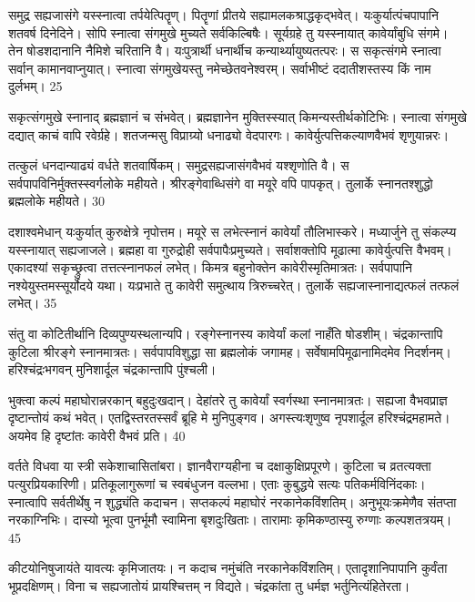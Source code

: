 समुद्र सह्यजासंगे यस्स्नात्वा तर्पयेत्पितॄण्।
पितॄणां प्रीतये सह्यामलकश्राद्धकृद्भवेत्।
यःकुर्यात्पंचपापानि शतवर्ष दिनेदिने।
सोपि स्नात्वा संगमुखे मुच्यते सर्वकिल्बिषैः।
सूर्यग्रहे तु यस्स्नायात् कावेर्यांबुधि संगमे।
तेन षोडशदानानि नैमिशे चरितानि वै।
यःपुत्रार्थी धनार्थीच कन्यार्थ्यायुष्यतत्परः।
स सकृत्संगमे स्नात्वा सर्वान् कामानवाप्नुयात्।
स्नात्वा संगमुखेयस्तु नमेच्छेतवनेश्वरम्।
सर्वाभीष्टं ददातीशस्तस्य किं नाम दुर्लभम्।
25

सकृत्संगमुखे स्नानाद् ब्रह्मज्ञानं च संभवेत्।
ब्रह्मज्ञानेन मुक्तिस्स्यात् किमन्यस्तीर्थकोटिभिः।
स्नात्वा संगमुखे दद्यात् काचं वापि रवेर्ग्रहे।
शतजन्मसु विप्राग्र्यो धनाढ्यो वेदपारगः।
कावेर्युत्पत्तिकल्याणवैभवं शृणुयान्नरः।

तत्कुलं धनदान्याढ्यं वर्धते शतवार्षिकम्।
समुद्रसह्यजासंगवैभवं यश्शृणोति वै।
स सर्वपापविनिर्मुक्तस्स्वर्गलोके महीयते।
श्रीरङ्गेवाब्धिसंगे वा मयूरे वपि पापकृत्।
तुलार्के स्नानतश्शुद्धो ब्रह्मलोके महीयते।
30

दशाश्वमेधान् यःकुर्यात् कुरुक्षेत्रे नृपोत्तम।
मयूरे स लभेत्स्नानं कावेर्यां तौलिभास्करे।
मध्यार्जुने तु संकल्प्य यस्स्नायात् सह्यजाजले।
ब्रह्महा वा गुरुद्रोही सर्वपापैःप्रमुच्यते।
सर्वाशक्तोपि मूढात्मा कावेर्युत्पत्ति वैभवम्।
एकादश्यां सकृच्छ्रुत्वा तत्तत्स्नानफलं लभेत्।
किमत्र बहुनोक्तेन कावेरीस्मृतिमात्रतः।
सर्वपापानि नश्येयुस्तमस्सूर्योदये यथा।
यःप्रभाते तु कावेरी समुत्थाय त्रिरुच्चरेत्।
तुलार्के सह्यजास्नानाद्यत्फलं तत्फलं लभेत्।
35

संतु वा कोटितीर्थानि दिव्यपुण्यस्थलान्यपि।
रङ्गेस्नानस्य कावेर्यां कलां नाहँति षोडशीम्।
चंद्रकान्तापि कुटिला श्रीरङ्गे स्नानमात्रतः।
सर्वपापविशुद्धा सा ब्रह्मलोकं जगामह।
सर्वेषामपिमूढानामिदमेव निदर्शनम्।
हरिश्चंद्रःभगवन् मुनिशार्दूल चंद्रकान्तापि पुंश्चली।

भुक्त्वा कल्पं महाघोरान्नरकान् बहुदुःखदान्।
देहांतरे तु कावेर्यां स्वर्गस्था स्नानमात्रतः।
सह्यजा वैभवप्राज्ञ दृष्टान्तोयं कथं भवेत्।
एतद्विस्तरतस्सर्वं ब्रूहि मे मुनिपुङ्गव।
अगस्त्यःशृणुष्व नृपशार्दूल हरिश्चंद्रमहामते।
अयमेव हि दृष्टांतः कावेरी वैभवं प्रति।
40

वर्तते विधवा या स्त्री सकेशाचासितांबरा।
ज्ञानवैराग्यहीना च दक्षाकुक्षिप्रपूरणे।
कुटिला च व्रतत्यक्ता पत्युरप्रियकारिणी।
प्रतिकूलागुरूणां च स्वबंधुजन वल्लभा।
एताः कुबुद्धये सत्यः पतिकर्मविनिंदकाः।
स्नात्वापि सर्वतीर्थेषु न शुद्ध्यंति कदाचन।
सप्तकल्पं महाघोरं नरकानेकविंशतिम्।
अनुभूयःक्रमेणैव संतप्ता नरकाग्निभिः।
दास्यो भूत्वा पुनर्भूमौ स्वामिना बृशदुःखिताः।
तारामाः कृमिकण्ठास्यु रुग्णाः कल्पशतत्रयम्।
45

कीटयोनिषुजायंते यावत्यः कृमिजातयः।
न कदाच नमुंचंति नरकानेकविंशतिम्।
एतादृशानिपापानि कुर्वंता भूप्रदक्षिणम्।
विना च सह्यजातोयं प्रायश्चित्तम् न विद्यते।
चंद्रकांता तु धर्मज्ञ भर्तुनित्यंहितेरता।

